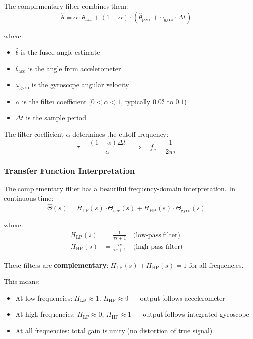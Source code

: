 The complementary filter combines them:
\begin{equation}
\hat{\theta} = \alpha \cdot \theta_{\text{acc}} + (1-\alpha) \cdot \left(\hat{\theta}_{\text{prev}} + \omega_{\text{gyro}} \cdot \Delta t\right)
\label{eq:complementary_discrete}
\end{equation}

where:
\begin{itemize}
    \item $\hat{\theta}$ is the fused angle estimate
    \item $\theta_{\text{acc}}$ is the angle from accelerometer
    \item $\omega_{\text{gyro}}$ is the gyroscope angular velocity
    \item $\alpha$ is the filter coefficient ($0 < \alpha < 1$, typically $0.02$ to $0.1$)
    \item $\Delta t$ is the sample period
\end{itemize}

The filter coefficient $\alpha$ determines the cutoff frequency:
\begin{equation}
\tau = \frac{(1-\alpha) \Delta t}{\alpha} \quad \Rightarrow \quad f_c = \frac{1}{2\pi\tau}
\label{eq:complementary_tau}
\end{equation}

\subsubsection{Transfer Function Interpretation}

The complementary filter has a beautiful frequency-domain interpretation. In continuous time:
\begin{equation}
\hat{\Theta}(s) = H_{\text{LP}}(s) \cdot \Theta_{\text{acc}}(s) + H_{\text{HP}}(s) \cdot \Theta_{\text{gyro}}(s)
\label{eq:complementary_tf}
\end{equation}

where:
\begin{align}
H_{\text{LP}}(s) &= \frac{1}{\tau s + 1} \quad \text{(low-pass filter)} \label{eq:lp_filter}\\
H_{\text{HP}}(s) &= \frac{\tau s}{\tau s + 1} \quad \text{(high-pass filter)} \label{eq:hp_filter}
\end{align}

These filters are \textbf{complementary}: $H_{\text{LP}}(s) + H_{\text{HP}}(s) = 1$ for all frequencies.

This means:
\begin{itemize}
    \item At low frequencies: $H_{\text{LP}} \approx 1$, $H_{\text{HP}} \approx 0$ --- output follows accelerometer
    \item At high frequencies: $H_{\text{LP}} \approx 0$, $H_{\text{HP}} \approx 1$ --- output follows integrated gyroscope
    \item At all frequencies: total gain is unity (no distortion of true signal)
\end{itemize}

